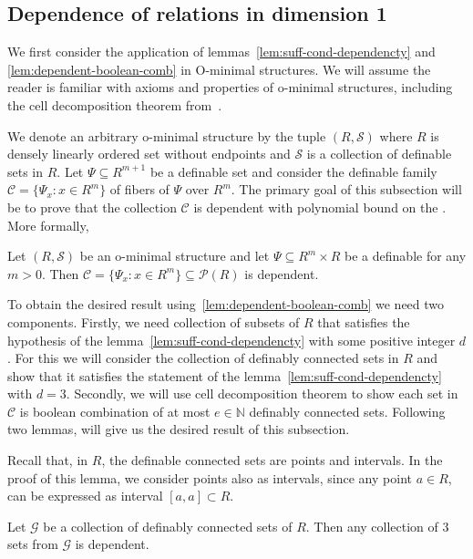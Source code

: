 \subsection{Dependence of relations in dimension 1}


We first consider the application of lemmas~\ref{lem:suff-cond-dependencty} and \ref{lem:dependent-boolean-comb} in O-minimal structures. We will assume the reader is familiar with axioms and properties of o-minimal structures, including the cell decomposition theorem from~\cite[Chap 1, 3]{vandenDries1998}.



We denote an arbitrary o-minimal structure by the tuple $(R, \mathcal{S})$ where $R$ is densely linearly ordered set without endpoints and $\mathcal{S}$ is a collection of definable sets in $R$. Let $\Psi \subseteq R^{m+1}$ be a definable set and consider the definable family $\mathcal{C} = \{\Psi_x: x \in R^m\}$ of fibers of $\Psi$ over $R^m$. The primary goal of this subsection will be to prove that the collection $\mathcal{C}$ is dependent with polynomial bound on the . More formally,

\begin{lemma}{\label{lem:o-minimal-dependence-hypothesis}}
    Let $(R, \mathcal{S})$ be an o-minimal structure and let $\Psi \subseteq R^m \times R$ be a definable for any $m > 0$. Then $\mathcal{C} = \{\Psi_x: x \in R^m\} \subseteq \mathcal{P}(R)$ is dependent.
\end{lemma}

To obtain the desired result using~\ref{lem:dependent-boolean-comb} we need two components. Firstly, we need collection of subsets of $R$ that satisfies the hypothesis of the lemma~\ref{lem:suff-cond-dependencty} with some positive integer $d$. For this we will consider the collection of definably connected sets in $R$ and show that it satisfies the statement of the lemma~\ref{lem:suff-cond-dependencty} with $d=3$. Secondly, we will use cell decomposition theorem to show each set in $\mathcal{C}$ is boolean combination of at most $e \in \mathbb{N}$ definably connected sets. Following two lemmas, will give us the desired result of this subsection.

Recall that, in $R$, the definable connected sets are points and intervals. In the proof of this lemma, we consider points also as intervals, since any point $a \in R$, can be expressed as interval $[a, a] \subset R$.
\begin{lemma}
    Let $\mathcal{G}$ be a collection of definably connected sets of $R$. Then any collection of 3 sets from $\mathcal{G}$ is dependent.
\end{lemma}

